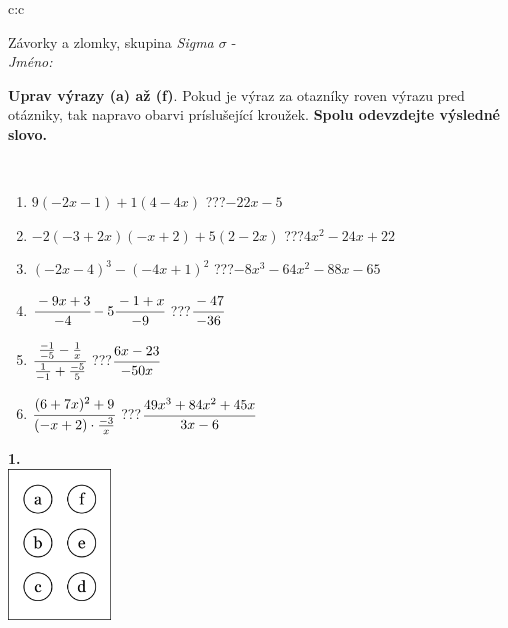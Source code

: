 \documentclass[10pt]{report}
\begin{document}
\begin{tabular}{c:c}
\begin{minipage}[c][104.5mm][t]{0.5\linewidth}
\begin{center}
\vspace{7mm}
{\huge Závorky a zlomky, skupina \textit{Sigma $\sigma$} -}\\[5mm]
\textit{Jméno:}\phantom{xxxxxxxxxxxxxxxxxxxxxxxxxxxxxxxxxxxxxxxxxxxxxxxxxxxxxxxxxxxxxxxxx}\\[5mm]
\begin{minipage}{0.95\linewidth}
\begin{center}
\textbf{Uprav výrazy (a) až (f)}. Pokud je výraz za otazníky roven výrazu pred otázniky, tak napravo obarvi príslušející kroužek. \textbf{Spolu odevzdejte výsledné slovo.}
\end{center}
\end{minipage}
\\[1mm]
\begin{minipage}{0.79\linewidth}
\begin{center}
\begin{varwidth}{\linewidth}
\begin{enumerate}
\normalsize
\item $9(-2x-1)+1(4-4x)$\quad \dotfill\; ???\;\dotfill \quad $-22x-5$
\item $-2(-3+2x)(-x+2)+5(2-2x)$\quad \dotfill\; ???\;\dotfill \quad $4x^2-24x+22$
\item $(-2x-4)^3-(-4x+1)^2$\quad \dotfill\; ???\;\dotfill \quad $-8x^3-64x^2-88x-65$
\item $\cfrac{-9x+3}{-4}-5\cfrac{-1+x}{-9}$\quad \dotfill\; ???\;\dotfill \quad $\cfrac{-47}{-36}$
\item $\cfrac{\frac{-1}{-5}-\frac{1}{x}}{\frac{1}{-1}+\frac{-5}{5}}$\quad \dotfill\; ???\;\dotfill \quad $\cfrac{6x-23}{-50x}$
\item $\cfrac{(6+7x)^2+9}{(-x+2)\cdot\frac{-3}{x}}$\quad \dotfill\; ???\;\dotfill \quad $\cfrac{49x^3+84x^2+45x}{3x-6}$
\end{enumerate}
\end{varwidth}
\end{center}
\end{minipage}
\begin{minipage}{0.20\linewidth}
\begin{center}
{\Huge\bfseries 1.} \\[2mm]
\includegraphics[height=40mm]{../images/braille.png}

\end{center}
\end{minipage}
\end{center}
\end{minipage}
\end{tabular}
\end{document}
